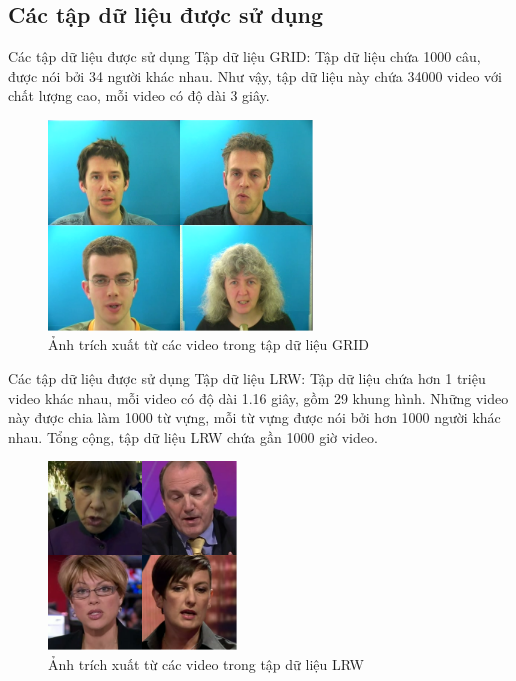 \subsection{Các tập dữ liệu được sử dụng}
\begin{frame}{Các tập dữ liệu được sử dụng}
Tập dữ liệu GRID: Tập dữ liệu chứa 1000 câu, được nói bởi 34 người khác nhau. Như vậy, tập dữ liệu này chứa 34000 video với chất lượng cao, mỗi video có độ dài 3 giây.

    \begin{figure}[H]
        \centering
        \includegraphics[width=7cm]{./images/grid.png}
        \caption{Ảnh trích xuất từ các video trong tập dữ liệu GRID}
    \end{figure}
\end{frame}

\begin{frame}{Các tập dữ liệu được sử dụng}
Tập dữ liệu LRW: Tập dữ liệu chứa hơn 1 triệu video khác nhau, mỗi video có độ dài 1.16 giây, gồm 29 khung hình. Những video này được chia làm 1000 từ vựng, mỗi từ vựng được nói bởi hơn 1000 người khác nhau. Tổng cộng, tập dữ liệu LRW chứa gần 1000 giờ video.
    \begin{figure}[H]
        \centering
        \includegraphics[width=5cm]{./images/lrw.png}
        \caption{Ảnh trích xuất từ các video trong tập dữ liệu LRW}
    \end{figure}
\end{frame}

